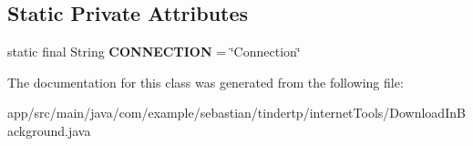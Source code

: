 \subsection*{Static Private Attributes}
\begin{DoxyCompactItemize}
\item 
static final String {\bfseries C\+O\+N\+N\+E\+C\+T\+I\+ON} = \char`\"{}Connection\char`\"{}\hypertarget{classcom_1_1example_1_1sebastian_1_1tindertp_1_1internetTools_1_1DownloadInBackground_a1fb948cc11bcfb195cdb9f91e10a3b02}{}\label{classcom_1_1example_1_1sebastian_1_1tindertp_1_1internetTools_1_1DownloadInBackground_a1fb948cc11bcfb195cdb9f91e10a3b02}

\end{DoxyCompactItemize}


The documentation for this class was generated from the following file\+:\begin{DoxyCompactItemize}
\item 
app/src/main/java/com/example/sebastian/tindertp/internet\+Tools/Download\+In\+Background.\+java\end{DoxyCompactItemize}
